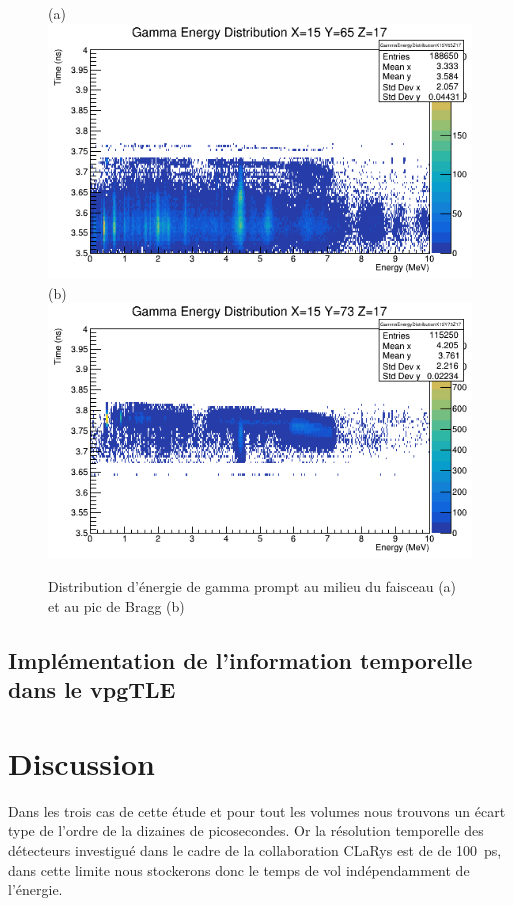 \documentclass[11pt,a4paper,oldfontcommands]{memoir}
\begin{document}
\begin{figure}[h!]
\centering
\subfloat(a){\includegraphics[scale=0.37]{CT/TPS/faisceaugamma.png}}
\subfloat(b){\includegraphics[scale=0.37]{CT/TPS/BraggGamma.png}}
\caption{Distribution d'énergie de gamma prompt au milieu du faisceau (a) et au pic de Bragg (b)}
\label{tps pg}
\end{figure}

\subsection{Implémentation de l'information temporelle dans le vpgTLE}

\section{Discussion}
Dans les trois cas de cette étude et pour tout les volumes nous trouvons un écart type de l'ordre de la dizaines de picosecondes. Or la résolution temporelle des détecteurs investigué dans le cadre de la collaboration CLaRys est de de 100~ps, dans cette limite nous stockerons donc le temps de vol indépendamment de l'énergie.  
\end{document}
